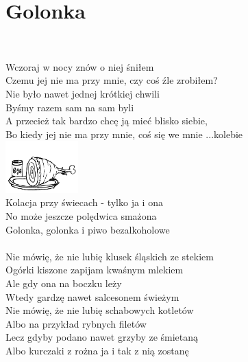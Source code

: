 \documentclass[a5paper, 10pt]{book}
\begin{document}
\section{Golonka}\textcolor{lightgray}{\textit{}}\vspace*{2mm}\\
\begin{minipage}[t]{0.77\textwidth}
Wczoraj w nocy znów o niej śniłem\\
Czemu jej nie ma przy mnie, czy coś źle zrobiłem?\\
Nie było nawet jednej krótkiej chwili\\
Byśmy razem sam na sam byli\vspace*{2mm}
\\
A przecież tak bardzo chcę ją mieć blisko siebie,\\
Bo kiedy jej nie ma przy mnie, coś się we mnie ...kolebie\\
\includegraphics[height=20mm,right]{images/golonka.png}\vspace*{-21mm}\\
Kolacja przy świecach - tylko ja i ona\\
No może jeszcze polędwica smażona\\

\hspace*{5mm}Golonka, golonka i piwo bezalkoholowe\\
\\
Nie mówię, że nie lubię klusek śląskich ze stekiem\\
Ogórki kiszone zapijam kwaśnym mlekiem\\
Ale gdy ona na boczku leży\\
Wtedy gardzę nawet salcesonem świeżym\vspace*{2mm}
\\
Nie mówię, że nie lubię schabowych kotletów\\
Albo na przykład rybnych filetów\\
Lecz gdyby podano nawet grzyby ze śmietaną\\
Albo kurczaki z rożna ja i tak z nią zostanę\\
\end{minipage}
\end{document}
